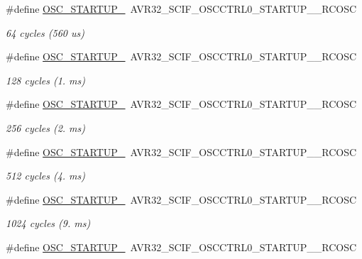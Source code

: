 \begin{DoxyCompactItemize}
\#define \hyperlink{group__osc__group_ga8bc169c58308f203fae7db712c32692c}{\-O\-S\-C\-\_\-\-S\-T\-A\-R\-T\-U\-P\-\_}~\-A\-V\-R32\-\_\-\-S\-C\-I\-F\-\_\-\-O\-S\-C\-C\-T\-R\-L0\-\_\-\-S\-T\-A\-R\-T\-U\-P\-\_\-\_\-\-R\-C\-O\-S\-C
\begin{DoxyCompactList}\small\item\em 64 cycles (560 us) \end{DoxyCompactList}\item 
\#define \hyperlink{group__osc__group_gab62df73141674d4d5ba34d6d50a79ab2}{\-O\-S\-C\-\_\-\-S\-T\-A\-R\-T\-U\-P\-\_}~\-A\-V\-R32\-\_\-\-S\-C\-I\-F\-\_\-\-O\-S\-C\-C\-T\-R\-L0\-\_\-\-S\-T\-A\-R\-T\-U\-P\-\_\-\_\-\-R\-C\-O\-S\-C
\begin{DoxyCompactList}\small\item\em 128 cycles (1. ms) \end{DoxyCompactList}\item 
\#define \hyperlink{group__osc__group_gad01a2bab22a19bdfcb3679acddbf0a88}{\-O\-S\-C\-\_\-\-S\-T\-A\-R\-T\-U\-P\-\_}~\-A\-V\-R32\-\_\-\-S\-C\-I\-F\-\_\-\-O\-S\-C\-C\-T\-R\-L0\-\_\-\-S\-T\-A\-R\-T\-U\-P\-\_\-\_\-\-R\-C\-O\-S\-C
\begin{DoxyCompactList}\small\item\em 256 cycles (2. ms) \end{DoxyCompactList}\item 
\#define \hyperlink{group__osc__group_ga64460354bcf3739fe1976877e88ccedc}{\-O\-S\-C\-\_\-\-S\-T\-A\-R\-T\-U\-P\-\_}~\-A\-V\-R32\-\_\-\-S\-C\-I\-F\-\_\-\-O\-S\-C\-C\-T\-R\-L0\-\_\-\-S\-T\-A\-R\-T\-U\-P\-\_\-\_\-\-R\-C\-O\-S\-C
\begin{DoxyCompactList}\small\item\em 512 cycles (4. ms) \end{DoxyCompactList}\item 
\#define \hyperlink{group__osc__group_gaf2249581b46c33d3f6b4a6d1f29073da}{\-O\-S\-C\-\_\-\-S\-T\-A\-R\-T\-U\-P\-\_}~\-A\-V\-R32\-\_\-\-S\-C\-I\-F\-\_\-\-O\-S\-C\-C\-T\-R\-L0\-\_\-\-S\-T\-A\-R\-T\-U\-P\-\_\-\_\-\-R\-C\-O\-S\-C
\begin{DoxyCompactList}\small\item\em 1024 cycles (9. ms) \end{DoxyCompactList}\item 
\#define \hyperlink{group__osc__group_ga7e6a7e9386171f5f3434e0ce1c749664}{\-O\-S\-C\-\_\-\-S\-T\-A\-R\-T\-U\-P\-\_}~\-A\-V\-R32\-\_\-\-S\-C\-I\-F\-\_\-\-O\-S\-C\-C\-T\-R\-L0\-\_\-\-S\-T\-A\-R\-T\-U\-P\-\_\-\_\-\-R\-C\-O\-S\-C

\end{DoxyCompactItemize}
